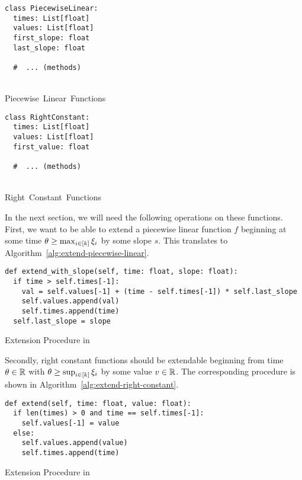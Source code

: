 \vspace{-1em}\begin{minipage}[t]{0.5\textwidth}
\begin{classdef}[H]
    \begin{verbatim}
class PiecewiseLinear:
  times: List[float]
  values: List[float]
  first_slope: float
  last_slope: float

  #  ... (methods)
\end{verbatim}
    \caption{\\Piecewise~Linear~Functions\vphantom{Right}}%
    \label{data:piecewise-linear}
\end{classdef}
\end{minipage}\hfill
\begin{minipage}[t]{0.5\textwidth}
\begin{classdef}[H]
    \begin{verbatim}
class RightConstant:
  times: List[float]
  values: List[float]
  first_value: float

  #  ... (methods)

\end{verbatim}
    \vspace{.084em}
    \caption{\\Right~Constant~Functions}%
    \label{data:right-constant}
\end{classdef}
\end{minipage}\vspace{1em}


In the next section, we will need the following operations on these functions.
First, we want to be able to extend a piecewise linear function $f$ beginning at some time $\theta \geq \max_{i\in[k]} \xi_i$ by some slope $s$.
This translates to Algorithm~\ref{alg:extend-piecewise-linear}.

\begin{algorithm}
  \begin{verbatim}
def extend_with_slope(self, time: float, slope: float):
  if time > self.times[-1]:
    val = self.values[-1] + (time - self.times[-1]) * self.last_slope
    self.values.append(val)
    self.times.append(time)
  self.last_slope = slope
  \end{verbatim}
  \caption{Extension Procedure in }
  \label{alg:extend-piecewise-linear}
\end{algorithm}

Secondly, right constant functions should be extendable beginning from time $\theta \in\mathbb{R}$ with $\theta \geq \sup_{i\in[k]} \xi_i$ by some value $v\in\mathbb{R}$.
The corresponding procedure is shown in Algorithm~\ref{alg:extend-right-constant}.
\begin{algorithm}
  \begin{verbatim}
def extend(self, time: float, value: float):
  if len(times) > 0 and time == self.times[-1]:
    self.values[-1] = value
  else:
    self.values.append(value)
    self.times.append(time)
  \end{verbatim}
  \caption{Extension Procedure in }
  \label{alg:extend-right-constant}
\end{algorithm}

